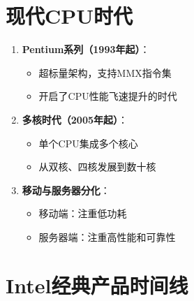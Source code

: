 \documentclass[12pt,UTF8]{ctexbook}
\begin{document}
\section{现代CPU时代}

\begin{enumerate}
    \item \textbf{Pentium系列（1993年起）}：
    \begin{itemize}[leftmargin=2em]
        \item 超标量架构，支持MMX指令集
        \item 开启了CPU性能飞速提升的时代
    \end{itemize}
    
    \item \textbf{多核时代（2005年起）}：
    \begin{itemize}[leftmargin=2em]
        \item 单个CPU集成多个核心
        \item 从双核、四核发展到数十核
    \end{itemize}
    
    \item \textbf{移动与服务器分化}：
    \begin{itemize}[leftmargin=2em]
        \item 移动端：注重低功耗
        \item 服务器端：注重高性能和可靠性
    \end{itemize}
\end{enumerate}

\section{Intel经典产品时间线}
\end{document}
